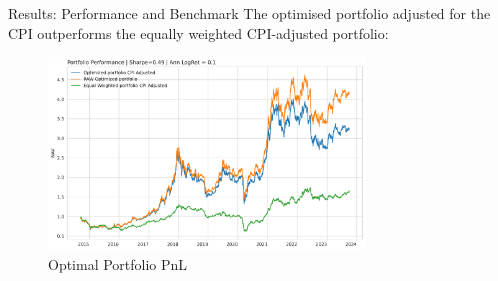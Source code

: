 \documentclass{beamer}
\begin{document}
\begin{frame}{Results: Performance and Benchmark}
The optimised portfolio adjusted for the CPI outperforms the equally weighted CPI-adjusted portfolio:
  \begin{figure}
    \centering
    \includegraphics[width=0.75\textwidth]{figure/PNL.pdf}
    \caption{Optimal Portfolio PnL}
  \end{figure}
\end{frame}
\end{document}

